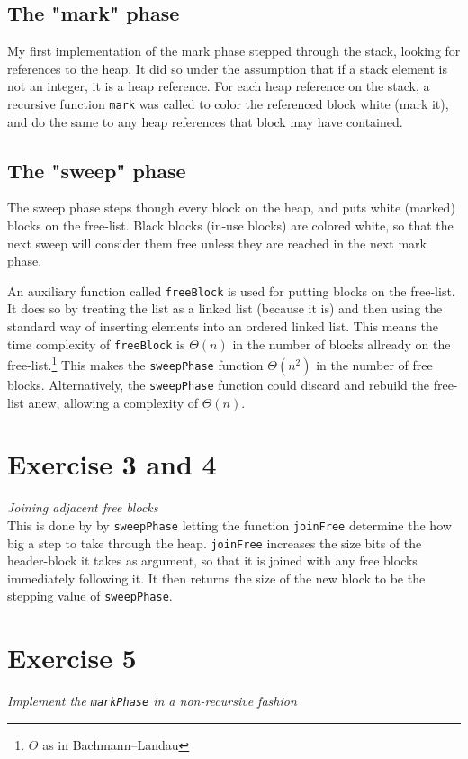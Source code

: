 \documentclass[a4paper, titlepage]{article}
\begin{document}
\subsection{The "mark" phase}
My first implementation of the mark phase stepped through the stack, looking for
references to the heap. It did so under the assumption that if a stack element
is not an integer, it is a
heap reference.
For each heap reference on the stack, a recursive function \texttt{mark} was
called to color the referenced block white (mark it), and do the same to
any heap references that block may have contained.

\subsection{The "sweep" phase}
The sweep phase steps though every block on the heap, and puts white (marked)
blocks on the free-list. Black blocks (in-use blocks) are colored white, so that
the next sweep will consider them free unless they are reached in the next mark
phase.

An auxiliary function called \texttt{freeBlock} is used for putting blocks on
the free-list. It does so by treating the list as a linked list (because it is)
and then using the standard way of inserting elements into an ordered linked
list. This means the time complexity of \texttt{freeBlock} is $\Theta(n)$ in the number
of blocks allready on the free-list.\footnote{$\Theta$ as in Bachmann–Landau}
This makes the \texttt{sweepPhase} function $\Theta(n^2)$ in the number of free
blocks. Alternatively, the \texttt{sweepPhase} function could discard and
rebuild the free-list anew, allowing a complexity of $\Theta(n)$.

\section{Exercise 3 and 4}
\textit{Joining adjacent free blocks}\\

This is done by by \texttt{sweepPhase} letting the function \texttt{joinFree}
determine the how big a step to take through the heap. \texttt{joinFree}
increases the size bits of the header-block it takes as argument, so that it is
joined with any free blocks immediately following it. It then returns the size
of the new block to be the stepping value of \texttt{sweepPhase}.

\section{Exercise 5}
\label{sec:Ex5}
\textit{Implement the \texttt{markPhase} in a non-recursive fashion}\\
\end{document}
